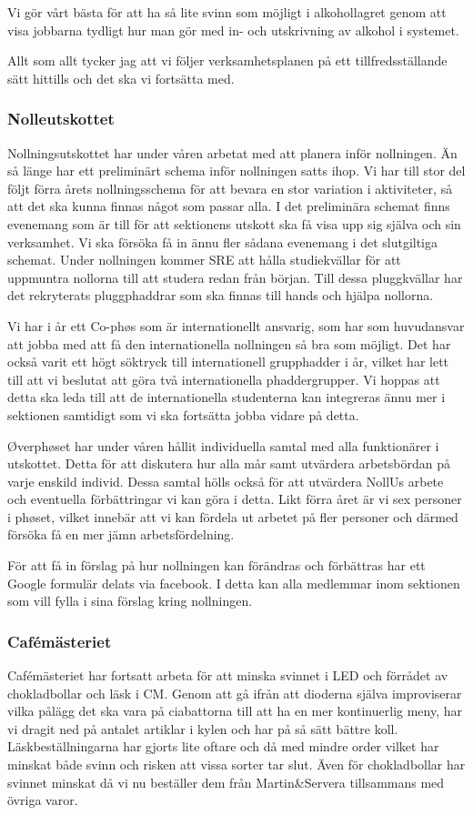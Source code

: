 \documentclass[../_main/handlingar.tex]{subfiles}
\begin{document}
Vi gör vårt bästa för att ha så lite svinn som möjligt i alkohollagret genom att visa jobbarna tydligt hur man gör med in- och utskrivning av alkohol i systemet.


Allt som allt tycker jag att vi följer verksamhetsplanen på ett tillfredsställande sätt hittills och det ska vi fortsätta med.

\newpage
\subsubsection*{Nolleutskottet}
Nollningsutskottet har under våren arbetat med att planera inför nollningen. Än så länge har ett preliminärt schema inför nollningen satts ihop. Vi har till stor del följt förra årets nollningsschema för att bevara en stor variation i aktiviteter, så att det ska kunna finnas något som passar alla. I det preliminära schemat finns evenemang som är till för att sektionens utskott ska få visa upp sig själva och sin verksamhet. Vi ska försöka få in ännu fler sådana evenemang i det slutgiltiga schemat. Under nollningen kommer SRE att hålla studiekvällar för att uppmuntra nollorna till att studera redan från början. Till dessa pluggkvällar har det rekryterats pluggphaddrar som ska finnas till hands och hjälpa nollorna. 

Vi har i år ett Co-phøs som är internationellt ansvarig, som har som huvudansvar att jobba med att få den internationella nollningen så bra som möjligt. Det har också varit ett högt söktryck till internationell grupphadder i år, vilket har lett till att vi beslutat att göra två internationella phaddergrupper. Vi hoppas att detta ska leda till att de internationella studenterna kan integreras ännu mer i sektionen samtidigt som vi ska fortsätta jobba vidare på detta.

Øverphøset har under våren hållit individuella samtal med alla funktionärer i utskottet. Detta för att diskutera hur alla mår samt utvärdera arbetsbördan på varje enskild individ. Dessa samtal hölls också för att utvärdera NollUs arbete och eventuella förbättringar vi kan göra i detta. Likt förra året är vi sex personer i phøset, vilket innebär att vi kan fördela ut arbetet på fler personer och därmed försöka få en mer jämn arbetsfördelning. 

För att få in förslag på hur nollningen kan förändras och förbättras har ett Google formulär delats via facebook. I detta kan alla medlemmar inom sektionen som vill fylla i sina förslag kring nollningen.

\subsubsection*{Cafémästeriet}
Cafémästeriet har fortsatt arbeta för att minska svinnet i LED och förrådet av chokladbollar och läsk i CM. Genom att gå ifrån att dioderna själva improviserar vilka pålägg det ska vara på ciabattorna till att ha en mer kontinuerlig meny, har vi dragit ned på antalet artiklar i kylen och har på så sätt bättre koll. Läskbeställningarna har gjorts lite oftare och då med mindre order vilket har minskat både svinn och risken att vissa sorter tar slut. Även för chokladbollar har svinnet minskat då vi nu beställer dem från Martin\&Servera tillsammans med övriga varor. 
\end{document}
